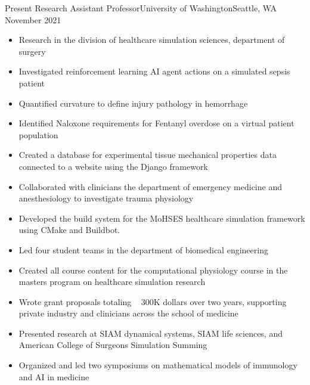 %
%
%

\begin{experiences}
  \experience
    {Present}   {Research Assistant Professor}{University of Washington}{Seattle, WA}
    {November 2021} {
                      \begin{itemize}
                        \item Research in the division of healthcare simulation sciences, department of surgery
                        \item Investigated reinforcement learning AI agent actions on a simulated sepsis patient
                        \item Quantified curvature to define injury pathology in hemorrhage
                        \item Identified Naloxone requirements for Fentanyl overdose on a virtual patient population 
                        \item Created a database for experimental tissue mechanical properties data connected to a website using the Django framework
                        \item Collaborated with clinicians the department of emergency medicine and anesthesiology to investigate trauma physiology
                        \item Developed the build system for the MoHSES healthcare simulation framework using CMake and Buildbot.
                        \item Led four student teams in the department of biomedical engineering
                        \item Created all course content for the computational physiology course in the masters program on healthcare simulation research
                        \item Wrote grant proposals totaling ~ 300K dollars over two years, supporting private industry and clinicians across the school of medicine
                        \item Presented research at SIAM dynamical systems, SIAM life sciences, and American College of Surgeons Simulation Summing 
                        \item Organized and led two symposiums on mathematical models of immunology and AI in medicine  

\end{itemize}}
\end{experiences}
